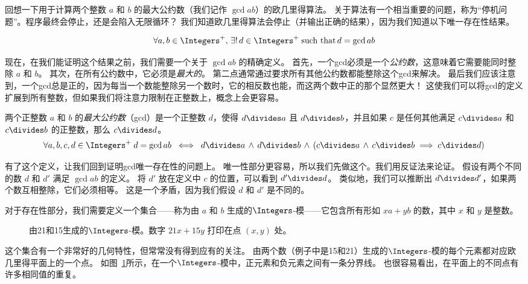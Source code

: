 回想一下用于计算两个整数 $a$ 和 $b$ 的最大公约数（我们记作 $\gcd{a}{b}$）的欧几里得算法。
关于算法有一个相当重要的问题，称为“停机问题”。程序最终会停止，还是会陷入无限循环？
我们知道欧几里得算法会停止（并输出正确的结果），因为我们知道以下唯一存在性结果。

\[ \forall a, b \in \Integers^+, \, \exists ! \, d \in \Integers^+ \; \mbox{such that} \, d=\gcd{a}{b} \]

现在，在我们能证明这个结果之前，我们需要一个关于 $\gcd{a}{b}$ 的精确定义。
首先，一个gcd必须是一个\emph{公约数}，这意味着它需要能同时整除 $a$ 和 $b$。
其次，在所有公约数中，它必须是\emph{最大的}。
第二点通常通过要求所有其他公约数都能整除这个gcd来解决。
最后我们应该注意到，一个gcd总是正的，因为每当一个数能整除另一个数时，它的相反数也能，而这两个数中正的那个显然更大！
这使我们可以将gcd的定义扩展到所有整数，但如果我们将注意力限制在正整数上，概念上会更容易。

\begin{defi}     
      两个正整数 $a$ 和 $b$ 的\emph{最大公约数}（gcd）是一个正整数 $d$，使得 $d \divides a$ 且 $d \divides b$，并且如果 $c$ 是任何其他满足 $c \divides a$ 和 $c \divides b$ 的正整数，那么 $c \divides d$。
      \[ \forall a,b,c,d \in \Integers^+ \; d=\gcd{a}{b} \; \iff \; d \divides a \, \land \, d \divides b \, \land \, (c \divides a \, \land \, c \divides b  \implies c \divides d)\]
\end{defi}

有了这个定义，让我们回到证明gcd唯一存在性的问题上。
唯一性部分更容易，所以我们先做这个。我们用反证法来论证。
假设有两个不同的数 $d$ 和 $d'$ 满足 $\gcd{a}{b}$ 的定义。
将 $d'$ 放在定义中 $c$ 的位置，可以看到 $d' \divides d$。
类似地，我们可以推断出 $d \divides d'$，如果两个数互相整除，它们必须相等。
这是一个矛盾，因为我们假设 $d$ 和 $d'$ 是不同的。

对于存在性部分，我们需要定义一个集合——称为由 $a$ 和 $b$ 生成的$\Integers$-模——它包含所有形如 $xa+yb$ 的数，其中 $x$ 和 $y$ 是整数。

\begin{figure}[!hbtp]
      \begin{center}
            
      \end{center}
      \caption[$\Integers$-模]{由21和15生成的$\Integers$-模。数字 $21x+15y$ 打印在点 $(x,y)$ 处。}
      \label{fig:zmodule}
\end{figure}

这个集合有一个非常好的几何特性，但常常没有得到应有的关注。
由两个数（例子中是15和21）生成的$\Integers$-模的每个元素都对应欧几里得平面上的一个点。
如图~\ref{fig:zmodule}所示，在一个$\Integers$-模中，正元素和负元素之间有一条分界线。
也很容易看出，在平面上的不同点有许多相同值的重复。

